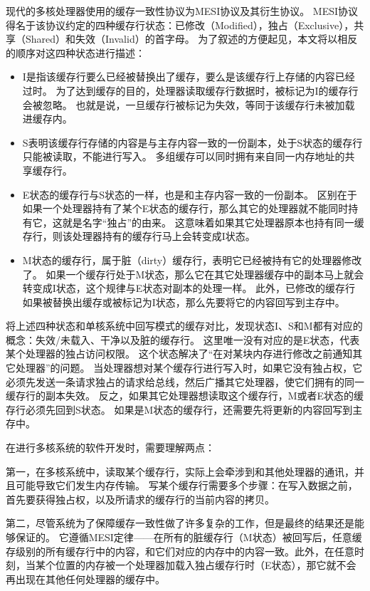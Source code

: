 现代的多核处理器使用的缓存一致性协议为MESI协议及其衍生协议。
MESI协议得名于该协议约定的四种缓存行状态：已修改（Modified），独占（Exclusive），共享（Shared）和失效（Invalid）的首字母。
为了叙述的方便起见，本文将以相反的顺序对这四种状态进行描述：
\begin{itemize}
	\item I是指该缓存行要么已经被替换出了缓存，要么是该缓存行上存储的内容已经过时。
	为了达到缓存的目的，处理器读取缓存行数据时，被标记为I的缓存行会被忽略。
	也就是说，一旦缓存行被标记为失效，等同于该缓存行未被加载进缓存内。
	\item S表明该缓存行存储的内容是与主存内容一致的一份副本，处于S状态的缓存行只能被读取，不能进行写入。
	多组缓存可以同时拥有来自同一内存地址的共享缓存行。
	\item E状态的缓存行与S状态的一样，也是和主存内容一致的一份副本。
	区别在于如果一个处理器持有了某个E状态的缓存行，那么其它的处理器就不能同时持有它，这就是名字“独占”的由来。
	这意味着如果其它处理器原本也持有同一缓存行，则该处理器持有的缓存行马上会转变成I状态。
	\item M状态的缓存行，属于脏（dirty）缓存行，表明它已经被持有它的处理器修改了。
	如果一个缓存行处于M状态，那么它在其它处理器缓存中的副本马上就会转变成I状态，这个规律与E状态对副本的处理一样。
	此外，已修改的缓存行如果被替换出缓存或被标记为I状态，那么先要将它的内容回写到主存中。
\end{itemize}

将上述四种状态和单核系统中回写模式的缓存对比，发现状态I、S和M都有对应的概念：失效/未载入、干净以及脏的缓存行。
这里唯一没有对应的是E状态，代表某个处理器的独占访问权限。
这个状态解决了“在对某块内存进行修改之前通知其它处理器”的问题。
当处理器想对某个缓存行进行写入时，如果它没有独占权，它必须先发送一条请求独占的请求给总线，然后广播其它处理器，使它们拥有的同一缓存行的副本失效。
反之，如果其它处理器想读取这个缓存行，M或者E状态的缓存行必须先回到S状态。
如果是M状态的缓存行，还需要先将更新的内容回写到主存中。

在进行多核系统的软件开发时，需要理解两点：

第一，在多核系统中，读取某个缓存行，实际上会牵涉到和其他处理器的通讯，并且可能导致它们发生内存传输。
写某个缓存行需要多个步骤：在写入数据之前，首先要获得独占权，以及所请求的缓存行的当前内容的拷贝。

第二，尽管系统为了保障缓存一致性做了许多复杂的工作，但是最终的结果还是能够保证的。
它遵循MESI定律\cite{Fabian-ryg}——在所有的脏缓存行（M状态）被回写后，任意缓存级别的所有缓存行中的内容，和它们对应的内存中的内容一致。此外，在任意时刻，当某个位置的内存被一个处理器加载入独占缓存行时（E状态），那它就不会再出现在其他任何处理器的缓存中。

